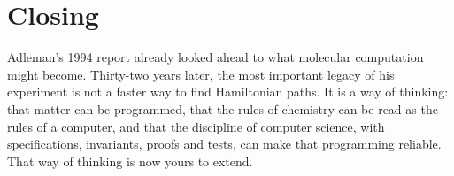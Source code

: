 \section*{Closing}
Adleman's 1994 report already looked ahead to what molecular computation might
become. Thirty-two years later, the most important
legacy of his experiment is not a faster way to find Hamiltonian paths. It is a
way of thinking: that matter can be programmed, that the rules of chemistry can
be read as the rules of a computer, and that the discipline of computer science,
with specifications, invariants, proofs and tests, can make that programming
reliable. That way of thinking is now yours to extend.
